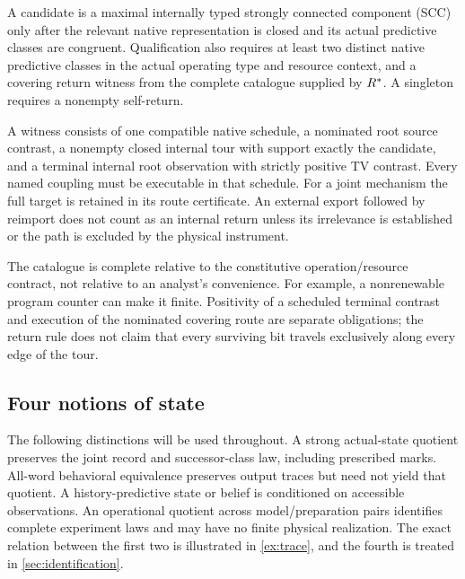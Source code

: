 A candidate is a maximal internally typed strongly connected component (SCC) only after the relevant native representation is closed and its actual predictive classes are congruent. Qualification also requires at least two distinct native predictive classes in the actual operating type and resource context, and a covering return witness from the complete catalogue supplied by \(R^{\ast}\). A singleton requires a nonempty self-return.

A witness consists of one compatible native schedule, a nominated root source contrast, a nonempty closed internal tour with support exactly the candidate, and a terminal internal root observation with strictly positive TV contrast. Every named coupling must be executable in that schedule. For a joint mechanism the full target is retained in its route certificate. An external export followed by reimport does not count as an internal return unless its irrelevance is established or the path is excluded by the physical instrument.

The catalogue is complete relative to the constitutive operation/resource contract, not relative to an analyst's convenience. For example, a nonrenewable program counter can make it finite. Positivity of a scheduled terminal contrast and execution of the nominated covering route are separate obligations; the return rule does not claim that every surviving bit travels exclusively along every edge of the tour.

\subsection{Four notions of state}
The following distinctions will be used throughout. A strong actual-state quotient preserves the joint record and successor-class law, including prescribed marks. All-word behavioral equivalence preserves output traces but need not yield that quotient. A history-predictive state or belief is conditioned on accessible observations. An operational quotient across model/preparation pairs identifies complete experiment laws and may have no finite physical realization. The exact relation between the first two is illustrated in \cref{ex:trace}, and the fourth is treated in \cref{sec:identification}.

